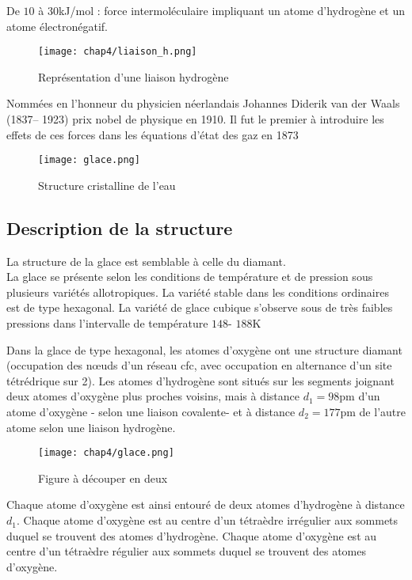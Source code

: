 \begin{rem}
    De $10$ à $30$kJ/mol : force intermoléculaire impliquant un
    atome d'hydrogène et un atome électronégatif.
\end{rem}
\begin{figure}
    \centering
    \texttt{[image: chap4/liaison\_h.png]}
    \caption{Représentation d'une liaison
        hydrogène}\label{fig:4_liason_h}
\end{figure}
\begin{rem}
    Nommées en l'honneur du physicien néerlandais Johannes
    Diderik van der Waals (1837\--- 1923) prix nobel de
    physique en 1910. Il fut le premier à introduire les
    effets de ces forces dans les équations d'état des gaz
    en 1873
\end{rem}
\begin{figure}
    \centering
    \texttt{[image: glace.png]}
    \caption{Structure cristalline de l'eau}\label{fig:glace}
\end{figure}

\subsection{Description de la structure}
La structure de la glace est semblable à celle du diamant.\\
La glace se présente selon les conditions de température et
de pression sous plusieurs variétés allotropiques.
La variété stable dans les conditions ordinaires est
de type hexagonal. La variété de glace cubique s’observe
sous de très faibles pressions dans l’intervalle de
température $148$\-- $188$K


Dans la glace de type hexagonal, les atomes d’oxygène
ont une structure diamant (occupation des nœuds d’un
réseau cfc, avec occupation en alternance d’un
site tétrédrique sur 2).
Les atomes d’hydrogène sont situés sur les segments
joignant deux atomes d’oxygène plus proches voisins,
mais à distance $d_1=98$pm d’un atome d’oxygène \-- selon
une liaison covalente\-- et à distance $d_2= 177$pm
de l’autre atome selon une liaison hydrogène.
\begin{figure}
    \centering
    \texttt{[image: chap4/glace.png]}
    \caption{Figure à découper en deux}
    \label{fig:4_maille_site_flace}
\end{figure}
Chaque atome d'oxygène est ainsi entouré de deux
atomes d'hydrogène à distance $d_1$.
Chaque atome d’oxygène est au centre d’un tétraèdre
irrégulier aux sommets duquel se trouvent des atomes
d’hydrogène. Chaque atome d’oxygène est au centre
d’un tétraèdre régulier aux sommets duquel se trouvent
des atomes d’oxygène.

